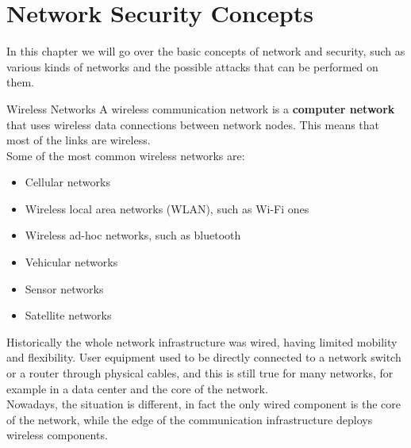 \chapter{Network Security Concepts}
In this chapter we will go over the basic concepts of network and security, such as various kinds
of networks and the possible attacks that can be performed on them.
\begin{section}{Wireless Networks}
  A wireless communication network is a \textbf{computer network} that uses wireless data connections
  between network nodes. This means that most of the links are wireless.\\
  Some of the most common wireless networks are:
  \begin{itemize}
    \item Cellular networks
    \item Wireless local area networks (WLAN), such as Wi-Fi ones
    \item Wireless ad-hoc networks, such as bluetooth
    \item Vehicular networks
    \item Sensor networks
    \item Satellite networks
  \end{itemize}
  Historically the whole network infrastructure was wired, having limited mobility and flexibility.
  User equipment used to be directly connected to a network switch or a router through physical cables,
  and this is still true for many networks, for example in a data center and the core of the network.\\
  Nowadays, the situation is different, in fact the only wired component is the core of the network,
  while the edge of the communication infrastructure deploys wireless components.
  \begin{figure}[H]
    \centering
    \hfill

\end{figure}
\end{section}
